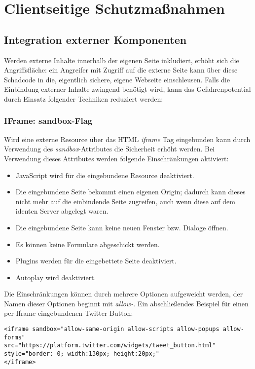 \chapter{Clientseitige Schutzmaßnahmen}

\section{Integration externer Komponenten}

Werden externe Inhalte innerhalb der eigenen Seite inkludiert, erhöht sich die Angriffsfläche: ein Angreifer mit Zugriff auf die externe Seite kann über diese Schadcode in die, eigentlich sichere, eigene Webseite einschleusen. Falls die Einbindung externer Inhalte zwingend benötigt wird, kann das Gefahrenpotential durch Einsatz folgender Techniken reduziert werden:

\subsection{IFrame: sandbox-Flag}

Wird eine externe Resource über das HTML \textit{iframe} Tag eingebunden kann durch Verwendung des \textit{sandbox}-Attributes die Sicherheit erhöht werden. Bei Verwendung dieses Attributes werden folgende Einschränkungen aktiviert:

\begin{itemize}
\item JavaScript wird für die eingebundene Resource deaktiviert.
\item Die eingebundene Seite bekommt einen eigenen Origin; dadurch kann dieses nicht mehr auf die einbindende Seite zugreifen, auch wenn diese auf dem identen Server abgelegt waren.
\item Die eingebundene Seite kann keine neuen Fenster bzw. Dialoge öffnen.
\item Es können keine Formulare abgeschickt werden.
\item Plugins werden für die eingebettete Seite deaktiviert.
\item Autoplay wird deaktiviert.
\end{itemize}

Die Einschränkungen können durch mehrere Optionen aufgeweicht werden, der Namen dieser Optionen beginnt mit \textit{allow-}. Ein abschließendes Beispiel für einen per Iframe eingebundenen Twitter-Button:

\begin{verbatim}
<iframe sandbox="allow-same-origin allow-scripts allow-popups allow-forms"
src="https://platform.twitter.com/widgets/tweet_button.html"
style="border: 0; width:130px; height:20px;"
</iframe>
\end{verbatim}

